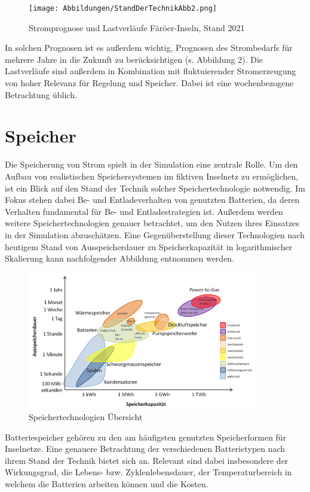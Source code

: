 \begin{figure}[h!]
    \centering
    \texttt{[image: Abbildungen/StandDerTechnikAbb2.png]}
    \caption{Stromprognose und Lastverläufe Färöer-Inseln, Stand 2021}\label{fig:Stromprognose_und_Lastverläufe}
\end{figure}

In solchen Prognosen ist es außerdem wichtig, Prognosen des Strombedarfs für mehrere Jahre in die Zukunft zu berücksichtigen (s. Abbildung 2). Die Lastverläufe sind außerdem in Kombination mit fluktuierender Stromerzeugung von hoher Relevanz für Regelung und Speicher. Dabei ist eine wochenbezogene Betrachtung üblich.

\section{Speicher}

Die Speicherung von Strom spielt in der Simulation eine zentrale Rolle. Um den Aufbau von realistischen Speichersystemen im fiktiven Inselnetz zu ermöglichen, ist ein Blick auf den Stand der Technik solcher Speichertechnologie notwendig. Im Fokus stehen dabei Be- und Entladeverhalten von genutzten Batterien, da deren Verhalten fundamental für Be- und Entladestrategien ist. Außerdem werden weitere Speichertechnologien genauer betrachtet, um den Nutzen ihres Einsatzes in der Simulation abzuschätzen. Eine Gegenüberstellung dieser Technologien nach heutigem Stand von Ausspeicherdauer zu Speicherkapazität in logarithmischer Skalierung kann nachfolgender Abbildung entnommen werden.

\begin{figure}[h!]
    \centering
    \includegraphics[width=10cm]{Abbildungen/StandDerTechnikAbb3.png}
    \caption{Speichertechnologien Übersicht}\label{fig:Speichertechnologien_Übersicht}
\end{figure}
 
Batteriespeicher gehören zu den am häufigsten genutzten Speicherformen für Inselnetze. Eine genauere Betrachtung der verschiedenen Batterietypen nach ihrem Stand der Technik bietet sich an. Relevant sind dabei insbesondere der Wirkungsgrad, die Lebens- bzw. Zyklenlebensdauer, der Temperaturbereich in welchem die Batterien arbeiten können und die Kosten.

